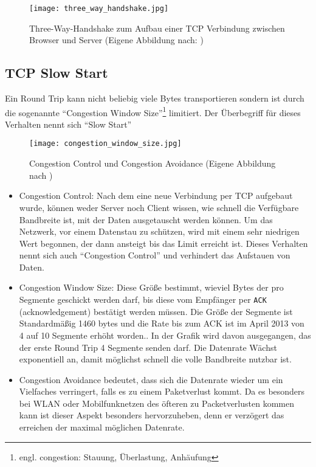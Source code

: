 		\begin{figure}[htbp]
			\begin{center}
				\texttt{[image: three\_way\_handshake.jpg]}
				\caption{Three-Way-Handshake zum Aufbau einer TCP Verbindung zwischen Browser und Server (Eigene Abbildung nach: \autocite{bos})}
				\label{fig:three_way_handshake}
			\end{center}
		\end{figure}

	\subsection{TCP Slow Start} %
	\label{sub:tcp_slow_start}

		Ein Round Trip kann nicht beliebig viele Bytes transportieren sondern ist durch die sogenannte "`Congestion Window Size"'\footnote{engl. congestion: Stauung, Überlastung, Anhäufung} limitiert. Der Überbegriff für dieses Verhalten nennt sich "`Slow Start"'

		\begin{figure}[htbp]
			\begin{center}
				\texttt{[image: congestion\_window\_size.jpg]}
				\caption{Congestion Control und Congestion Avoidance (Eigene Abbildung nach \autocite{grigorikSlowStart})}
				\label{fig:congestion_window_size}
			\end{center}
		\end{figure} 

		\begin{itemize}
			\item Congestion Control: Nach dem eine neue Verbindung per TCP aufgebaut wurde, können weder Server noch Client wissen, wie schnell die Verfügbare Bandbreite ist, mit der Daten ausgetauscht werden können. Um das Netzwerk, vor einem Datenstau zu schützen, wird mit einem sehr niedrigen Wert begonnen, der dann ansteigt bis das Limit erreicht ist. Dieses Verhalten nennt sich auch "`Congestion Control"' und verhindert das Aufstauen von Daten.
			\item Congestion Window Size: Diese Größe bestimmt, wieviel Bytes der pro Segmente geschickt werden darf, bis diese vom Empfänger per \texttt{ACK} (acknowledgement) bestätigt werden müssen. Die Größe der Segmente ist Standardmäßig 1460 bytes und die Rate bis zum ACK ist im April 2013 von 4 auf 10 Segmente erhöht worden.\autocite{grigorikSlowStart}. In der Grafik wird davon ausgegangen, das der erste Round Trip 4 Segmente senden darf. Die Datenrate Wächst exponentiell an, damit möglichst schnell die volle Bandbreite nutzbar ist.\\
			\item Congestion Avoidance bedeutet, dass sich die Datenrate wieder um ein Vielfaches verringert, falls es zu einem Paketverlust kommt. Da es besonders bei WLAN oder Mobilfunknetzen des öfteren zu Packetverlusten kommen kann ist dieser Aspekt besonders hervorzuheben, denn er verzögert das erreichen der maximal möglichen Datenrate.
		\end{itemize}

